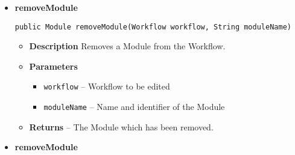 \documentclass[11pt,a4paper]{report}
\begin{document}
{{{{{{{{{{{\begin{itemize}
{\begin{itemize}
{								Use this method to generate a Workflow of the given Preferences. This changes the Workflow.
							}
							\item{
								{\bf  Parameters}
								\begin{itemize}
									\item{\texttt{workflow} -- The Workflow generated by the user or the system.}
									\item{\texttt{studySubject} -- The StudySubject related to the Workflow}
									\item{\texttt{preferences} -- All user preferences. Module related preferences have to be added in this object}
								\end{itemize}
							}%
							\item{
								{\bf  Returns} 
								-- A Collection of Mistakes occurred during generation. 
							}%
						\end{itemize}
					}%
					\item{ 
						\hypertarget{studyplanning.model.WorkflowOperations.removeModule(studyplanning.model.workflow.Workflow, java.lang.String)}{{\bf  removeModule}\\}
						\begin{lstlisting}[frame=none]
public Module removeModule(Workflow workflow, String moduleName)
						\end{lstlisting} %
						\begin{itemize}
							\item{
								{\bf  Description}
								Removes a Module from the Workflow.
							}
							\item{
								{\bf  Parameters}
								\begin{itemize}
									\item{\texttt{workflow} -- Workflow to be edited}
									\item{\texttt{moduleName} -- Name and identifier of the Module}
								\end{itemize}
							}%
							\item{
								{\bf  Returns} 
								-- The Module which has been removed. 
							}%
						\end{itemize}
					}%
					\item{ 
						\hypertarget{studyplanning.model.WorkflowOperations.removeModule(studyplanning.model.workflow.Workflow, java.lang.String, int)}{{\bf  removeModule}\\}
}
\end{itemize}}}}}}}}}}}}
\end{document}
